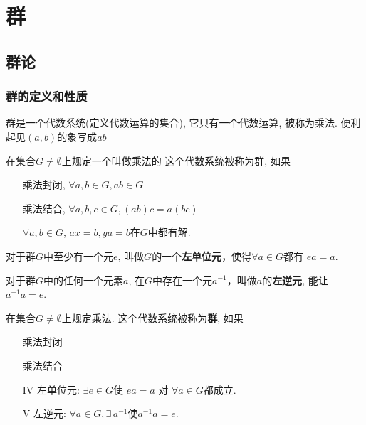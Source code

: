 \chapter{群}

\section{群论}

\subsection{群的定义和性质}

\begin{Remark}
群是一个代数系统(定义代数运算的集合), 它只有一个代数运算, 被称为乘法. 便利起见$(a, b)$的象写成$a b$ %
\end{Remark}

\begin{Definition}
在集合$G \neq \emptyset$上规定一个叫做乘法的\;\;%
这个代数系统被称为群, 如果
\begin{itemize}
	\item[\uppercase\expandafter{\romannumeral1}] 乘法封闭, $\forall a, b \in G, ab \in G$ %
	\item[\uppercase\expandafter{\romannumeral2}] 乘法结合, $\forall a, b, c \in G, (ab)c = a(bc)$
	\item[\uppercase\expandafter{\romannumeral3}] $ \forall a, b \in G$, $ax = b, ya = b$在$G$中都有解.
\end{itemize}
\end{Definition}

\begin{Theorem}[左单位元]
对于群$G$中至少有一个元$e$, 叫做$G$的一个\textbf{左单位元}，使得$\forall a \in G$都有 $ea = a$.
\end{Theorem}

\begin{Theorem}[左逆元]
对于群$G$中的任何一个元素$a$, 在$G$中存在一个元$a^{-1}$，叫做$a$的\textbf{左逆元}, 能让$a^{-1} a = e$.
\end{Theorem}

\begin{Definition}
在集合$G \neq \emptyset$上规定乘法. 这个代数系统被称为\textbf{群}, 如果
\begin{itemize}
	\item[\uppercase\expandafter{\romannumeral1}] 乘法封闭
	\item[\uppercase\expandafter{\romannumeral2}] 乘法结合
	\item[IV] 左单位元: $\exists e \in G$使 $ea =a$ 对 $\forall a \in G$都成立.
	\item[V] 左逆元: $\forall a \in G, \exists \, a^{-1}$使$a^{-1}a = e$.
\end{itemize}
\end{Definition}

